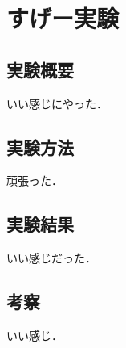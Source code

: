\documentclass[a4paper, 11pt]{ltjsarticle}
\begin{document}
\section{すげー実験}

\subsection{実験概要}

いい感じにやった．

\subsection{実験方法}

頑張った．

\subsection{実験結果}

いい感じだった．

\subsection{考察}
いい感じ．
\end{document}
